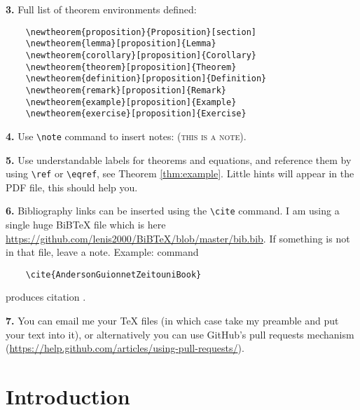 \documentclass[letterpaper,11pt,oneside,reqno]{amsart}
\numberwithin{equation}{section}
\newcommand{\note}[1]{\textsc{\color{blue}(#1)}}
\theoremstyle{definition}
\begin{document}
\textbf{3.} Full list of theorem environments defined:
\begin{lstlisting}
	\newtheorem{proposition}{Proposition}[section]
	\newtheorem{lemma}[proposition]{Lemma}
	\newtheorem{corollary}[proposition]{Corollary}
	\newtheorem{theorem}[proposition]{Theorem}
	\newtheorem{definition}[proposition]{Definition}
	\newtheorem{remark}[proposition]{Remark}
	\newtheorem{example}[proposition]{Example}
	\newtheorem{exercise}[proposition]{Exercise}	
\end{lstlisting}

\textbf{4.} Use \lstinline{\note} command to insert notes: \note{this is a note}.

\textbf{5.} Use understandable labels for theorems and equations, and reference them by using \lstinline{\ref}
or \lstinline{\eqref}, see Theorem \ref{thm:example}. Little hints will appear in the PDF file, 
this should help you.

\textbf{6.} Bibliography links can be inserted using the \lstinline{\cite}
command. I am using a single huge BiBTeX file which is here
\url{https://github.com/lenis2000/BiBTeX/blob/master/bib.bib}. 
If something is not in that file, leave a note. 
Example: command 
\begin{lstlisting}
	\cite{AndersonGuionnetZeitouniBook}
\end{lstlisting}
produces citation
\cite{AndersonGuionnetZeitouniBook}.


\textbf{7.} You can email me your \TeX{} files (in which case take
my preamble and put your text into it), or alternatively you can use GitHub's pull requests mechanism
(\url{https://help.github.com/articles/using-pull-requests/}).


\section{Introduction} %
\label{sec:introduction}










\end{document}

